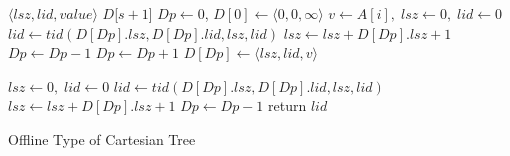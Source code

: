 \begin{algorithm}
\SetAlgoNoLine
{}
$\langle\mathit{lsz},\mathit{lid},\mathit{value}\rangle$ $D$[$s+1$] \;
$\textit{Dp} \gets 0$, $D[0] \gets \langle 0,0,\infty \rangle$ \;
 {
  $v \gets A[i], \; \textit{lsz} \gets 0, \; \textit{lid} \gets 0$ \;
   {
    $\textit{lid} \gets \textit{tid}(D[\textit{Dp}].\textit{lsz}, D[\textit{Dp}].\textit{lid}, \textit{lsz}, \textit{lid})$ \;
    $\textit{lsz} \gets \textit{lsz} + D[\textit{Dp}].\textit{lsz} + 1$ \;
    $\textit{Dp} \gets \textit{Dp} - 1$ \;
  }
  $\textit{Dp} \gets \textit{Dp} + 1$ \;
  $D[\textit{Dp}] \gets \langle\mathit{lsz},\mathit{lid},\mathit{v}\rangle$ \;
}

$\textit{lsz} \gets 0, \; \textit{lid} \gets 0$ \;
 {
  $\textit{lid} \gets \textit{tid}(D[\textit{Dp}].\textit{lsz}, D[\textit{Dp}].\textit{lid}, \textit{lsz}, \textit{lid})$ \;
  $\textit{lsz} \gets \textit{lsz} + D[\textit{Dp}].\textit{lsz} + 1$ \;
  $\textit{Dp} \gets \textit{Dp} - 1$ \;
}
return $\textit{lid}$ \;

\caption{Offline Type of Cartesian Tree}
\label{alg:cartesian-encode-offline}
\end{algorithm}